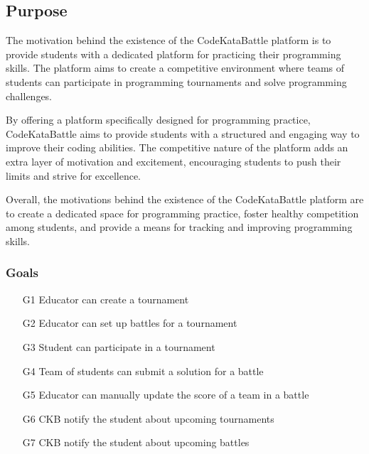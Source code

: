 \setlength{\headheight}{13.59999pt}
\addtolength{\topmargin}{-1.59999pt}

\subsection{Purpose}
The motivation behind the existence of the CodeKataBattle platform is to provide students with a dedicated platform for practicing their programming skills. The platform aims to create a competitive environment where teams of students can participate in programming tournaments and solve programming challenges.

By offering a platform specifically designed for programming practice, CodeKataBattle aims to provide students with a structured and engaging way to improve their coding abilities. The competitive nature of the platform adds an extra layer of motivation and excitement, encouraging students to push their limits and strive for excellence.

Overall, the motivations behind the existence of the CodeKataBattle platform are to create a dedicated space for programming practice, foster healthy competition among students, and provide a means for tracking and improving programming skills.

\subsubsection{Goals}
\begin{enumerate}
    \item[G1] Educator can create a tournament
    \item[G2] Educator can set up battles for a tournament
    \item[G3] Student can participate in a tournament
    \item[G4] Team of students can submit a solution for a battle
    \item[G5] Educator can manually update the score of a team in a battle
    \item[G6] CKB notify the student about upcoming tournaments
    \item[G7] CKB notify the student about upcoming battles
\end{enumerate}

